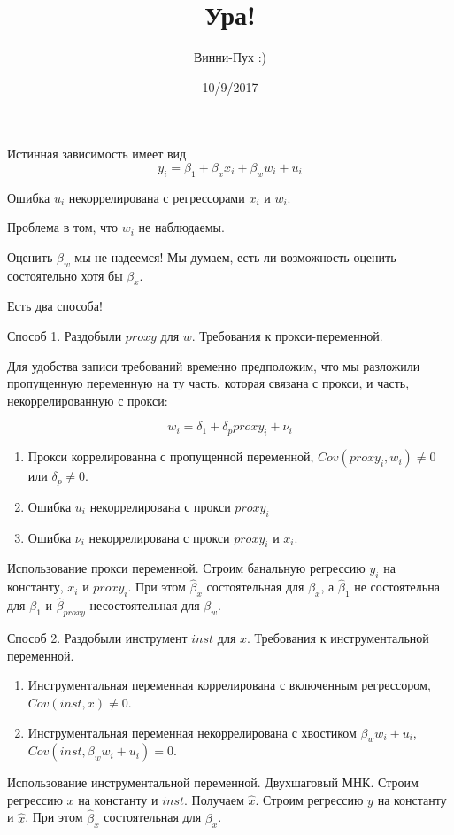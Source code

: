 \documentclass[11pt,russian,]{article}
\title{Ура!}
\author{Винни-Пух :)}
\date{10/9/2017}
\begin{document}
\maketitle

Истинная зависимость имеет вид \[
y_i = \beta_1 + \beta_x x_i + \beta_w w_i + u_i
\]

Ошибка \(u_i\) некоррелирована с регрессорами \(x_i\) и \(w_i\).

Проблема в том, что \(w_i\) не наблюдаемы.

Оценить \(\beta_w\) мы не надеемся! Мы думаем, есть ли возможность
оценить состоятельно хотя бы \(\beta_x\).

Есть два способа!

Способ 1. Раздобыли \(proxy\) для \(w\). Требования к прокси-переменной.

Для удобства записи требований временно предположим, что мы разложили
пропущенную переменную на ту часть, которая связана с прокси, и часть,
некоррелированную с прокси:

\[
w_i = \delta_1 + \delta_p proxy_i + \nu_i
\]

\begin{enumerate}
\def\labelenumi{\arabic{enumi}.}
\item
  Прокси коррелированна с пропущенной переменной,
  \(Cov(proxy_i, w_i) \neq 0\) или \(\delta_p \neq 0\).
\item
  Ошибка \(u_i\) некоррелирована с прокси \(proxy_i\)
\item
  Ошибка \(\nu_i\) некоррелирована с прокси \(proxy_i\) и \(x_i\).
\end{enumerate}

Использование прокси переменной. Строим банальную регрессию \(y_i\) на
константу, \(x_i\) и \(proxy_i\). При этом \(\hat\beta_x\) состоятельная
для \(\beta_x\), а \(\hat\beta_1\) не состоятельна для \(\beta_1\) и
\(\hat\beta_{proxy}\) несостоятельная для \(\beta_w\).

Способ 2. Раздобыли инструмент \(inst\) для \(x\). Требования к
инструментальной переменной.

\begin{enumerate}
\def\labelenumi{\arabic{enumi}.}
\item
  Инструментальная переменная коррелирована с включенным регрессором,
  \(Cov(inst, x) \neq 0\).
\item
  Инструментальная переменная некоррелирована с хвостиком
  \(\beta_w w_i + u_i\), \(Cov(inst, \beta_w w_i + u_i)=0\).
\end{enumerate}

Использование инструментальной переменной. Двухшаговый МНК. Строим
регрессию \(x\) на константу и \(inst\). Получаем \(\hat x\). Строим
регрессию \(y\) на константу и \(\hat x\). При этом \(\hat\beta_x\)
состоятельная для \(\beta_x\).
\end{document}
